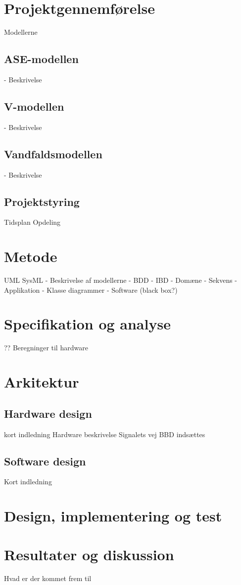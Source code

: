 \section{Projektgennemførelse}
Modellerne
\subsection{ASE-modellen}
- Beskrivelse
\subsection{V-modellen}
- Beskrivelse
\subsection{Vandfaldsmodellen}
- Beskrivelse
\subsection{Projektstyring}
Tidsplan
Opdeling
\section{Metode}
UML
SysML
- Beskrivelse af modellerne
	- BDD
	- IBD
	- Domæne
	- Sekvens
	- Applikation
	- Klasse diagrammer
	- Software (black box?)
	
	
	
	\section{Specifikation og analyse}
	??
	Beregninger til hardware
	\section{Arkitektur}
	\subsection{Hardware design}
	kort indledning
	Hardware beskrivelse
	Signalets vej
	BBD indsættes
	\subsection{Software design}
	Kort indledning
	\section{Design, implementering og test}
	
	
	
\section{Resultater og diskussion}
Hvad er der kommet frem til
